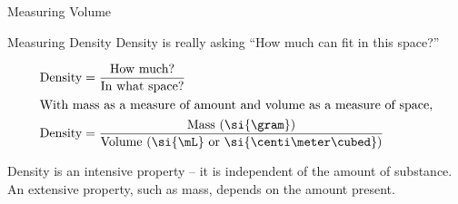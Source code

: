 \documentclass[10pt,letterpaper,twoside]{article}
\begin{document}

\begin{frame}{Measuring Volume}
	\begin{center}
\end{center}
\end{frame}


\begin{frame}{Measuring Density}
	Density is really asking ``How much can fit in this space?''

	\begin{align*}
		\text{Density} &= \frac{\text{How much?}}{\text{In what space?}}
		\\
		\intertext{With mass as a measure of amount and volume as a
		measure of space,}
		\text{Density} &= \frac{\text{Mass (\si{\gram})}}{\text{Volume
		(\si{\mL} or \si{\centi\meter\cubed})}}
	\end{align*}

	Density is an \alert{intensive property} -- it is independent of the
	amount of substance. An \alert{extensive property}, such as mass, depends
	on the amount present.
\end{frame}
\end{document}

